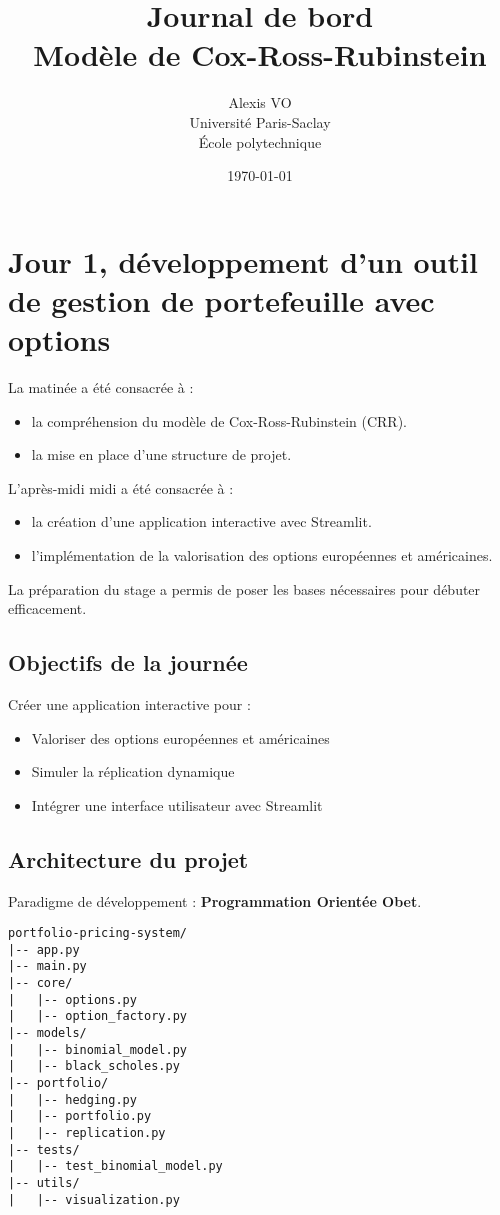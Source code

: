\documentclass[a4paper,11pt]{article}
\title{\Huge Journal de bord\\[1ex]
\Large Modèle de Cox-Ross-Rubinstein\\[1ex]}
\author{Alexis VO\\Université Paris-Saclay\\ École polytechnique}
\date{\today}
\begin{document}
\maketitle
\newpage
\tableofcontents
\newpage


\section{Jour 1, développement d’un outil de gestion de portefeuille avec options}
\noindent La matinée a été consacrée à :
\begin{itemize}
    \item la compréhension du modèle de Cox-Ross-Rubinstein (CRR).
    \item la mise en place d'une structure de projet.
\end{itemize}
L'après-midi midi a été consacrée à :
\begin{itemize}
    \item la création d'une application interactive avec Streamlit.
    \item l'implémentation de la valorisation des options européennes et américaines.
\end{itemize}
La préparation du stage a permis de poser les bases nécessaires pour débuter efficacement.

\subsection{Objectifs de la journée}
Créer une application interactive pour :
\begin{itemize}
    \item Valoriser des options européennes et américaines
    \item Simuler la réplication dynamique
    \item Intégrer une interface utilisateur avec Streamlit
\end{itemize}

\subsection{Architecture du projet}
Paradigme de développement : \textbf{Programmation Orientée Obet}.
\begin{verbatim}
portfolio-pricing-system/
|-- app.py
|-- main.py
|-- core/
|   |-- options.py
|   |-- option_factory.py
|-- models/
|   |-- binomial_model.py
|   |-- black_scholes.py
|-- portfolio/
|   |-- hedging.py
|   |-- portfolio.py
|   |-- replication.py
|-- tests/
|   |-- test_binomial_model.py
|-- utils/
|   |-- visualization.py
\end{verbatim}
\end{document}
